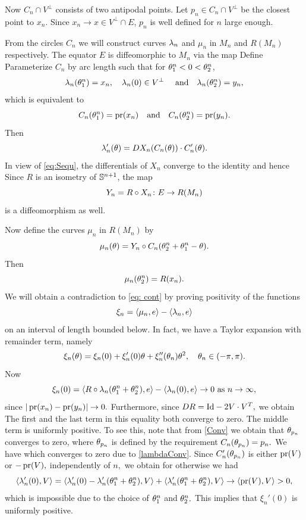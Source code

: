 \documentclass{amsart}
\begin{document}
{Now $C_n \cap V^{\perp}$ consists of two antipodal points. Let $p_n \in C_n \cap V^{\perp}$ be the closest point to $x_n$. Since $x_n \to x \in V^{\perp} \cap E$, $p_n$ is well defined for $n$ large enough.

From the circles $C_n$ we will construct curves $\l_n$ and $\mu_n$ in $M_n$ and $R(M_n)$ respectively. The equator $E$ is diffeomorphic to $M_n$ via the map
Define
Parameterize $C_n$ by arc length such that for $\t_1^n<0<\t_2^n$,
\[\l_n(\t_1^n)=x_n,\quad \l_n(0)\in V^{\perp}\quad~\text{and}\quad \l_n(\t_2^n)=y_n,\]
which is equivalent to
\[C_n(\t^n_1)=\pr(x_n)\quad\text{and}\quad C_n(\t^n_2)=\pr(y_n).\]
Then
\[\l_n'(\t)=DX_n(C_n(\t))\cdot C_n'(\t).\]
In view of \eqref{eq:Sequ}, the differentials of $X_n$ converge to the identity and hence
Since $R$ is an isometry of $\S^{n+1}$, the map
\[Y_n=R\circ X_n\cn E\ra R(M_n)\]
is a diffeomorphism as well.

Now define the curves $\mu_n$ in $R(M_n)$ by
\[\mu_n(\t)=Y_n\circ C_n(\t^n_2+\t^n_1-\t).\]
Then
\[\mu_n(\t^n_2)=R(x_n).\]
We will obtain a contradiction to \eqref{eq: cont} by proving positivity of the functions
\[\xi_n=\inpr{\mu_n}{e}-\inpr{\l_n}{e}\]
on an interval of length bounded below.
In fact, we have a Taylor expansion with remainder term, namely
\[\xi_n(\t)=\xi_n(0)+\xi_n'(0)\t+\xi_n''(\t_n)\t^2,\quad \t_n\in (-\pi,\pi).\]
Now
\[\xi_n(0)=\inpr{R\circ\l_n(\t^n_1+\t^n_2)}{e}-\inpr{\l_n(0)}{e}\ra 0~\text{as}~ n\ra\8,\]
since $|\pr(x_n)-\pr(y_n)|\ra 0.$
Furthermore, since $DR=\mrm{Id}-2V\cdot V^{T},$ we obtain
 The first and the last term in this equality both converge to zero. The middle term is uniformly positive. To see this, note that
 from \eqref{Conv} we obtain that $\t_{p_n}$ converges to zero, where $\t_{p_n}$ is defined by the requirement $C_n(\t_{p_n})=p_n.$ We have
which converges to zero due to \eqref{lambdaConv}. Since $C_n'(\t_{p_n})$ is either $\pr(V)$ or $-\pr(V),$ independently of $n,$ we obtain
for otherwise we had
$$\inpr{\l_n'(0)}{V}=\inpr{\l_n'(0)-\l_n'(\t^n_1+\t^n_2)}{V}+\inpr{\l_n'(\t^n_1+\t^n_2)}{V}\ra \inpr{\pr(V)}{V}>0,$$
which is impossible due to the choice of $\t^n_1$ and $\t^n_2.$ This implies that $\xi_n'(0)$ is uniformly positive.

}
\end{document}
